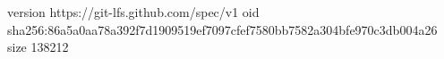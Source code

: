 version https://git-lfs.github.com/spec/v1
oid sha256:86a5a0aa78a392f7d1909519ef7097cfef7580bb7582a304bfe970c3db004a26
size 138212
